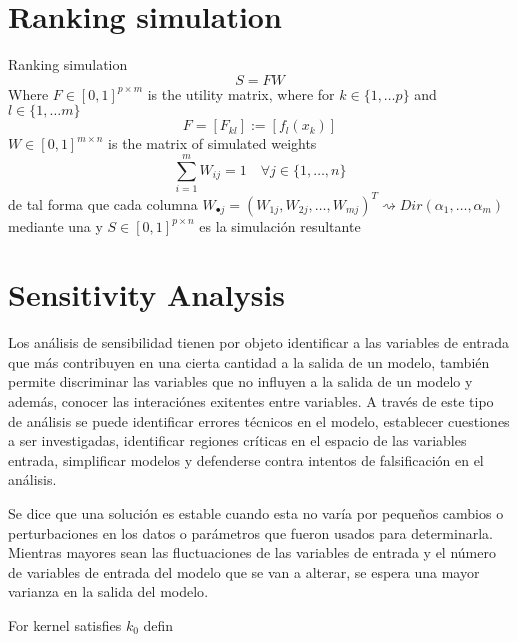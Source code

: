 \section{Ranking simulation}
Ranking simulation
\[ S = F W \]
Where $F\in[0,1]^{p\times m}$ is the utility matrix, where for $k\in\{1,\ldots p\}$ and
$l\in\{1,\ldots m\}$
\[ F = [F_{kl}] := [f_l(x_k)] \]
$W\in[0,1]^{m\times n}$ is the matrix of simulated weights
\[ \sum_{i=1}^m W_{ij} = 1 \quad \forall j\in\{1,\ldots,n\}\]
de tal forma que cada columna $W_{\bullet j} = (W_{1j},W_{2j},\ldots,W_{mj})^T\rightsquigarrow
Dir(\alpha_1,\ldots,\alpha_m)$ mediante una
y $S\in[0,1]^{p\times n}$ es la simulación resultante


\section{Sensitivity Analysis}
Los análisis de sensibilidad tienen por objeto identificar a las variables de entrada que más 
contribuyen en una cierta cantidad a la salida de un modelo, también permite discriminar las
variables que no influyen a la salida de un modelo y además, conocer las interaciónes exitentes
entre variables\citep{4}. A través de este tipo de análisis se puede identificar errores técnicos en
el modelo, establecer cuestiones a ser investigadas, identificar regiones críticas en el espacio de
las variables entrada, simplificar modelos y defenderse contra intentos de falsificación en el
análisis\citep{5}. 

Se dice que una solución es estable cuando esta no varía por pequeños cambios o perturbaciones en 
los datos o parámetros que fueron usados para determinarla\citep{2}. Mientras mayores sean las
fluctuaciones de las variables de entrada y el número de variables de entrada del modelo que se van
a alterar, se espera una mayor varianza en la salida del modelo\citep{5}. 

\begin{proposition}
For kernel satisfies $k_0$ defin
 
\end{proposition}

